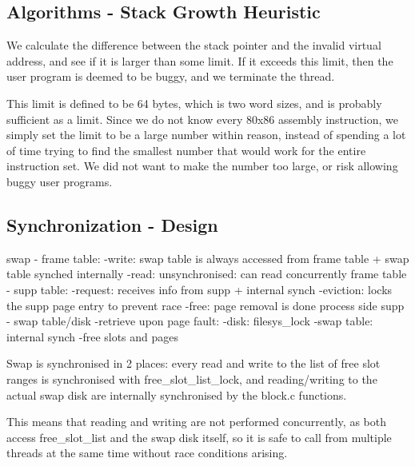 \subsection{Algorithms - Stack Growth Heuristic}


We calculate the difference between the stack pointer and the invalid virtual
address, and see if it is larger than some limit. If it exceeds this limit, then
the user program is deemed to be buggy, and we terminate the thread.

This limit is defined to be 64 bytes, which is two word sizes, and is probably
sufficient as a limit.  Since we do not know every 80x86 assembly instruction,
we simply set the limit to be a large number within reason, instead of spending
a lot of time trying to find the smallest number that would work for the entire
instruction set. We did not want to make the number too large, or risk allowing
buggy user programs.

\subsection{Synchronization - Design}

swap - frame table:
  -write: swap table is always accessed from frame table + swap table synched internally
  -read: unsynchronised: can read concurrently %
frame table - supp table:
  -request: receives info from supp + internal synch
  -eviction: locks the supp page entry to prevent race
  -free: page removal is done process side
supp - swap table/disk
  -retrieve upon page fault:
    -disk: filesys\_lock
    -swap table: internal synch
  -free slots and pages
  
Swap is synchronised in 2 places: every read and write to the list of free slot ranges is synchronised with free\_slot\_list\_lock, and reading/writing to the actual swap disk are internally synchronised by the block.c functions.

This means that reading and writing are not performed concurrently, as both access free\_slot\_list and the swap disk itself, so it is safe to call from multiple threads at the same time without race conditions arising.

